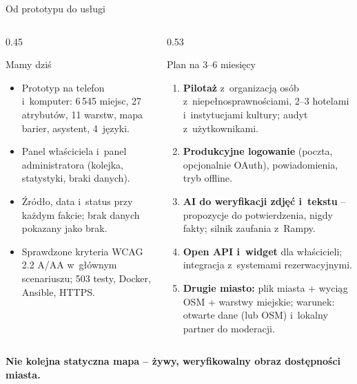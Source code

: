 \begin{frame}{Od prototypu do usługi}
  \begin{columns}[T,onlytextwidth]
    \begin{column}{0.45\textwidth}
      \begin{exampleblock}{Mamy dziś}
        \footnotesize
        \begin{itemize}
          \item Prototyp na telefon i~komputer: 6\,545 miejsc, 27 atrybutów, 11 warstw, mapa barier, asystent, 4~języki.
          \item Panel właściciela i~panel administratora (kolejka, statystyki, braki danych).
          \item Źródło, data i~status przy każdym fakcie; brak danych pokazany jako brak.
          \item Sprawdzone kryteria WCAG 2.2 A/AA w~głównym scenariuszu; 503 testy, Docker, Ansible, HTTPS.
        \end{itemize}
      \end{exampleblock}
    \end{column}
    \begin{column}{0.53\textwidth}
      \begin{block}{Plan na 3--6 miesięcy}
        \footnotesize
        \begin{enumerate}
          \item \textbf{Pilotaż} z~organizacją osób z~niepełnosprawnościami, 2--3 hotelami i~instytucjami kultury;
                audyt z~użytkownikami.
          \item \textbf{Produkcyjne logowanie} (poczta, opcjonalnie OAuth), powiadomienia, tryb offline.
          \item \textbf{AI do weryfikacji zdjęć i~tekstu} -- propozycje do potwierdzenia, nigdy fakty; silnik zaufania z~Rampy.
          \item \textbf{Open API i~widget} dla właścicieli; integracja z~systemami rezerwacyjnymi.
          \item \textbf{Drugie miasto:} plik miasta + wyciąg OSM + warstwy miejskie; warunek: otwarte dane (lub OSM)
                i~lokalny partner do moderacji.
        \end{enumerate}
      \end{block}
    \end{column}
  \end{columns}
  \vspace{1.5mm}
  \centering
  {\bfseries\color{accNavy}Nie kolejna statyczna mapa -- żywy, weryfikowalny obraz dostępności miasta.\par}
  \vspace{0.8mm}


\end{frame}
